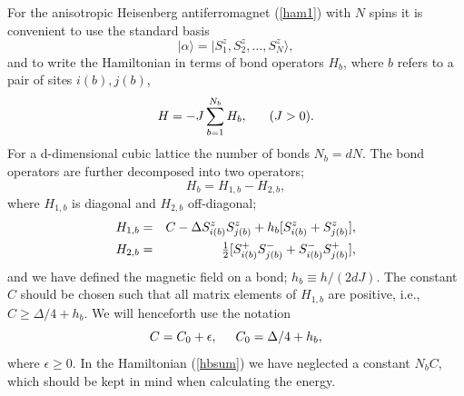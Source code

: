 \documentclass[10pt,pre,aps,twocolumn,showpacs,superscriptaddress,
floatfix]{revtex4}
\begin{document}
For the anisotropic Heisenberg antiferromagnet (\ref{ham1}) with $N$ spins
it is convenient to use the standard basis
\begin{equation}
|\alpha\rangle = |S^z_1,S^z_2,\ldots,S^z_N\rangle,
\end{equation}
and to write the Hamiltonian in terms of bond operators $H_b$, where
$b$ refers to a pair of sites $i(b),j(b)$,
\begin{equation}
H = -J\sum_{b=1}^{N_b} H_b, \hskip6mm (J>0).
\label{hbsum}
\end{equation}
For a d-dimensional cubic lattice the number of bonds $N_b=dN$. The bond 
operators are further decomposed into two operators;
\begin{equation}
H_b = H_{1,b} - H_{2,b},
\label{hbdef}
\end{equation}
where $H_{1,b}$ is diagonal and $H_{2,b}$ off-diagonal;
\begin{eqnarray}
H_{1,b} & = &
C - \Delta S^z_{i(b)}S^z_{j(b)} + h_b[S^z_{i(b)}+S^z_{j(b)}], 
\label{hb1} \\
H_{2,b} & = & \hbox{$1\over 2$}[S^+_{i(b)}S^-_{j(b)} + S^-_{i(b)}S^+_{j(b)}],
\label{hb2}
\end{eqnarray}
and we have defined the magnetic field on a bond; $h_b \equiv h/(2dJ)$. The 
constant $C$ should be chosen such that all matrix elements of $H_{1,b}$ 
are positive, i.e., $C \ge \Delta/4+h_b$. We will henceforth use the notation
\begin{equation}
C = C_0 + \epsilon,\hskip 5mm C_0 = \Delta/4+h_b,
\label{cdef}
\end{equation}
where $\epsilon \ge 0$. In the Hamiltonian (\ref{hbsum}) we have neglected 
a constant $N_bC$, which should be kept in mind when calculating the energy.
\end{document}
